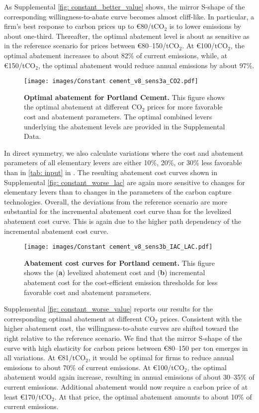 \documentclass[12pt, a4paper]{article} %
\newcommand{\methods}{\nameref{sec: methods}} %
\newcommand{\Suppl}{Supplemental}
\begin{document}
\newpage
As \Suppl$ $ \autoref{fig: constant_better_value} shows, the mirror S-shape of the corresponding willingness-to-abate curve becomes almost cliff-like. In particular, a firm's best response to carbon prices up to \euro 80/tCO$_2$ is to lower emissions by about one-third. Thereafter, the optimal abatement level is about as sensitive as in the reference scenario for prices between \euro 80--150/tCO$_2$. At \euro 100/tCO$_2$, the optimal abatement increases to about 82\% of current emissions, while, at \euro 150/tCO$_2$, the optimal abatement would reduce annual emissions by about 97\%.

\begin{figure}[ht]
\centering
\texttt{[image: images/Constant cement\_v8\_sens3a\_CO2.pdf]}
\caption{\textbf{Optimal abatement for Portland Cement.} This figure shows the optimal abatement at different CO$_2$ prices for more favorable cost and abatement parameters. The optimal combined levers underlying the abatement levels are provided in the \Suppl$ $ Data.}
\label{fig: constant_better_value}
\end{figure}

In direct symmetry, we also calculate variations where the cost and abatement parameters of all elementary levers are either 10\%, 20\%, or 30\% less favorable than in \autoref{tab: input} in \methods. The resulting abatement cost curves shown in \Suppl$ $ \autoref{fig: constant_worse_lac} are again more sensitive to changes for elementary levers than to changes in the parameters of the carbon capture technologies. Overall, the deviations from the reference scenario are more substantial for the incremental abatement cost curve than for the levelized abatement cost curve. This is again due to the higher path dependency of the incremental abatement cost curve.

\begin{figure}[ht]
\centering
\texttt{[image: images/Constant cement\_v8\_sens3b\_IAC\_LAC.pdf]}
\caption{\textbf{Abatement cost curves for Portland cement.} This figure shows the (\textbf{a}) levelized abatement cost and (\textbf{b}) incremental abatement cost for the cost-efficient emission thresholds for less favorable cost and abatement parameters.}
\label{fig: constant_worse_lac}
\end{figure}

\newpage
\Suppl$ $ \autoref{fig: constant_worse_value} reports our results for the corresponding optimal abatement at different CO$_2$ prices. Consistent with the higher abatement cost, the willingness-to-abate curves are shifted toward the right relative to the reference scenario. We find that the mirror S-shape of the curve with high elasticity for carbon prices between \euro 80--150 per ton emerges in all variations. At \euro 81/tCO$_2$, it would be optimal for firms to reduce annual emissions to about 70\% of current emissions. At \euro 100/tCO$_2$, the optimal abatement would again increase, resulting in annual emissions of about 30--35\% of current emissions. Additional abatement would now require a carbon price of at least \euro 170/tCO$_2$. At that price, the optimal abatement amounts to about 10\% of current emissions.
\end{document}
